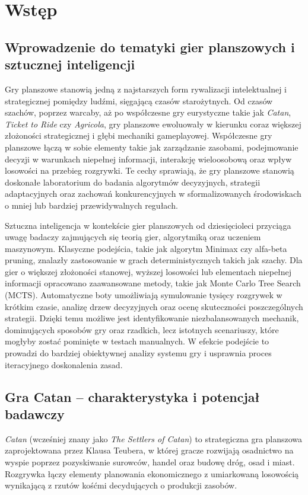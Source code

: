 \documentclass[polish,inz,longabstract]{iithesis}
\author{Maciej Stempniak \and
    Yaryna Rachkevych
}
\begin{document}
\chapter{Wstęp}
\section{Wprowadzenie do tematyki gier planszowych i sztucznej inteligencji}

Gry planszowe stanowią jedną z najstarszych form rywalizacji intelektualnej i strategicznej pomiędzy ludźmi, sięgającą czasów starożytnych. Od czasów szachów, poprzez warcaby, aż po współczesne gry eurystyczne takie jak \textit{Catan}, \textit{Ticket to Ride} czy \textit{Agricola}, gry planszowe ewoluowały w kierunku coraz większej złożoności strategicznej i głębi mechaniki gameplayowej. Współczesne gry planszowe łączą w sobie elementy takie jak zarządzanie zasobami, podejmowanie decyzji w warunkach niepełnej informacji, interakcję wieloosobową oraz wpływ losowości na przebieg rozgrywki. Te cechy sprawiają, że gry planszowe stanowią doskonałe laboratorium do badania algorytmów decyzyjnych, strategii adaptacyjnych oraz zachowań konkurencyjnych w sformalizowanych środowiskach o mniej lub bardziej przewidywalnych regułach.

Sztuczna inteligencja w kontekście gier planszowych od dziesięcioleci przyciąga uwagę badaczy zajmujących się teorią gier, algorytmiką oraz uczeniem maszynowym. Klasyczne podejścia, takie jak algorytm Minimax czy alfa-beta pruning, znalazły zastosowanie w grach deterministycznych takich jak szachy. Dla gier o większej złożoności stanowej, wyższej losowości lub elementach niepełnej informacji opracowano zaawansowane metody, takie jak Monte Carlo Tree Search (MCTS). Automatyczne boty umożliwiają symulowanie tysięcy rozgrywek w krótkim czasie, analizę drzew decyzyjnych oraz ocenę skuteczności poszczególnych strategii. Dzięki temu możliwe jest identyfikowanie niezbalansowanych mechanik, dominujących sposobów gry oraz rzadkich, lecz istotnych scenariuszy, które mogłyby zostać pominięte w testach manualnych. W efekcie podejście to prowadzi do bardziej obiektywnej analizy systemu gry i usprawnia proces iteracyjnego doskonalenia zasad.

\section{Gra Catan – charakterystyka i potencjał badawczy}

\textit{Catan} (wcześniej znany jako \textit{The Settlers of Catan}) to strategiczna gra planszowa zaprojektowana przez Klausa Teubera, w której gracze rozwijają osadnictwo na wyspie poprzez pozyskiwanie surowców, handel oraz budowę dróg, osad i miast. Rozgrywka łączy elementy planowania ekonomicznego z umiarkowaną losowością wynikającą z rzutów kośćmi decydujących o produkcji zasobów.
\end{document}

